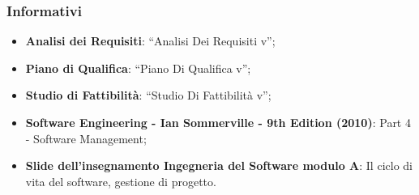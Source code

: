 		\subsubsection{Informativi}
			\begin{itemize}
				\item \textbf{Analisi dei Requisiti}: “Analisi Dei Requisiti v\lastversion{}”;
				\item \textbf{Piano di Qualifica}: “Piano Di Qualifica v\lastversion{}”;
				\item \textbf{Studio di Fattibilità}: “Studio Di Fattibilità v\lastversion{}”;
				\item \textbf{Software Engineering - Ian Sommerville - 9th Edition (2010)}: Part 4 - Software Management;
				\item \textbf{Slide dell’insegnamento Ingegneria del Software modulo A}: Il ciclo di vita del software, gestione di progetto.
			\end{itemize}